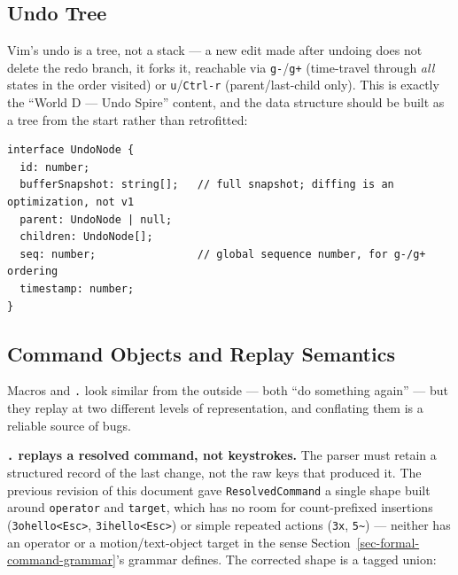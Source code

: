 \documentclass[11pt]{article}
\begin{document}
\hypertarget{sec-undo-tree}{%
\subsection{Undo Tree}\label{sec-undo-tree}}

Vim's undo is a tree, not a stack --- a new edit made after undoing does not
delete the redo branch, it forks it, reachable via \texttt{g-}/\texttt{g+} (time-travel
through \emph{all} states in the order visited) or \texttt{u}/\texttt{Ctrl-r} (parent/last-child
only). This is exactly the ``World D --- Undo Spire'' content, and the data
structure should be built as a tree from the start rather than retrofitted:

\begin{Verbatim}[breaklines=true, breakanywhere=true, fontsize=\small]
interface UndoNode {
  id: number;
  bufferSnapshot: string[];   // full snapshot; diffing is an optimization, not v1
  parent: UndoNode | null;
  children: UndoNode[];
  seq: number;                // global sequence number, for g-/g+ ordering
  timestamp: number;
}
\end{Verbatim}

\hypertarget{sec-command-objects-and-replay-semantics}{%
\subsection{Command Objects and Replay Semantics}\label{sec-command-objects-and-replay-semantics}}

Macros and \texttt{.} look similar from the outside --- both ``do something again'' --- but
they replay at two different levels of representation, and conflating them
is a reliable source of bugs.

\textbf{\texttt{.} replays a resolved command, not keystrokes.} The parser must retain a
structured record of the last change, not the raw keys that produced it.
The previous revision of this document gave \texttt{ResolvedCommand} a single
shape built around \texttt{operator} and \texttt{target}, which has no room for
count-prefixed insertions (\texttt{3ohello\textless{}Esc\textgreater{}}, \texttt{3ihello\textless{}Esc\textgreater{}}) or simple
repeated actions (\texttt{3x}, \texttt{5\textasciitilde{}}) --- neither has an operator or a
motion/text-object target in the sense Section~\ref{sec-formal-command-grammar}'s grammar defines. The
corrected shape is a tagged union:
\end{document}
